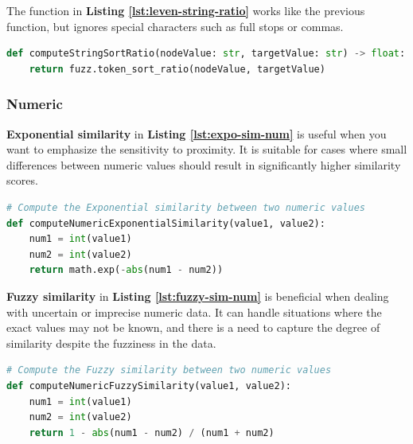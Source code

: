     
    The function in \textbf{Listing \ref{lst:leven-string-ratio}} works like the previous function, but ignores special characters such as full stops or commas.\\
    
\begin{lstlisting}[language=Python, caption=Levenstein Distance Between Two Strings Without Considering Special Characters, label={lst:leven-string-ratio}]
def computeStringSortRatio(nodeValue: str, targetValue: str) -> float:
    return fuzz.token_sort_ratio(nodeValue, targetValue)
\end{lstlisting}





    \subsubsection{Numeric}
    
    \textbf{Exponential similarity} in \textbf{Listing \ref{lst:expo-sim-num}} is useful when you want to emphasize the sensitivity to proximity. It is suitable for cases where small differences between numeric values should result in significantly higher similarity scores.\\
    
\begin{lstlisting}[language=Python, caption=Function to Compute the Similarity Value Between Two Numerics using the Exponential Function, label={lst:expo-sim-num}]
# Compute the Exponential similarity between two numeric values
def computeNumericExponentialSimilarity(value1, value2):
    num1 = int(value1)
    num2 = int(value2)
    return math.exp(-abs(num1 - num2))
\end{lstlisting}
    
    
    \textbf{Fuzzy similarity} in \textbf{Listing \ref{lst:fuzzy-sim-num}} is beneficial when dealing with uncertain or imprecise numeric data. It can handle situations where the exact values may not be known, and there is a need to capture the degree of similarity despite the fuzziness in the data.\\
\begin{lstlisting}[language=Python, caption=Function to Compute the Similarity Value Between Two Numerics using the Fuzzy Computation, label={lst:fuzzy-sim-num}]
# Compute the Fuzzy similarity between two numeric values
def computeNumericFuzzySimilarity(value1, value2):
    num1 = int(value1)
    num2 = int(value2)
    return 1 - abs(num1 - num2) / (num1 + num2)
\end{lstlisting}

